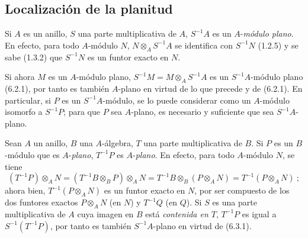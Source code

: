 \subsection{Localización de la planitud}
\label{subsection:0.6.3-fr}

\begin{env}[6.3.1]
\label{0.6.3.1-fr}
Si $A$ es un anillo, $S$ una parte multiplicativa de $A$, $S^{-1}A$ es
un $A$-\emph{módulo plano}. En efecto, para todo $A$-módulo $N$,
$N\otimes_A S^{-1}A$ se identifica con $S^{-1}N$ (1.2.5) y se sabe (1.3.2)
que $S^{-1}N$ es un funtor exacto en $N$.

Si ahora $M$ es un $A$-módulo plano,
$S^{-1}M=M\otimes_A S^{-1}A$ es un $S^{-1}A$-módulo plano (6.2.1), por tanto
es también $A$-plano en virtud de lo que precede y de (6.2.1). En particular,
si $P$ es un $S^{-1}A$-módulo, se lo puede considerar como un $A$-módulo
isomorfo a $S^{-1}P$; para que $P$ sea $A$-plano, es necesario y suficiente
que sea $S^{-1}A$-plano.
\end{env}

\begin{env}[6.3.2]
\label{0.6.3.2-fr}
Sean $A$ un anillo, $B$ una $A$-álgebra, $T$ una parte multiplicativa de
$B$. Si $P$ es un $B$-módulo que es $A$-\emph{plano}, $T^{-1}P$ es $A$-\emph{plano}. En
efecto, para todo $A$-módulo $N$, se tiene
\[
  (T^{-1}P)\otimes_A N
  =(T^{-1}B\otimes_B P)\otimes_A N
  =T^{-1}B\otimes_B(P\otimes_A N)
  =T^{-1}(P\otimes_A N)~;
\]
ahora bien, $T^{-1}(P\otimes_A N)$ es un funtor exacto en $N$, por ser compuesto de los
dos funtores exactos $P\otimes_A N$ (en $N$) y $T^{-1}Q$ (en $Q$). Si $S$
es una parte multiplicativa de $A$ cuya imagen en $B$ está
\emph{contenida en $T$}, $T^{-1}P$ es igual a $S^{-1}(T^{-1}P)$, por tanto es
también $S^{-1}A$-plano en virtud de (6.3.1).
\end{env}

